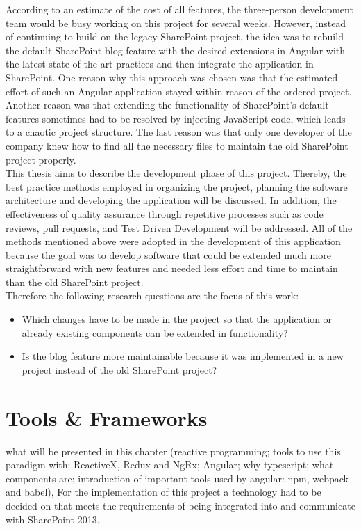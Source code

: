 \documentclass[Bachelor,BIF,english]{twbook}
\begin{document}
According to an estimate of the cost of all features, the three-person development team would be busy working on this project for several weeks. However, instead of continuing to build on the legacy SharePoint project, the idea was to rebuild the default SharePoint blog feature with the desired extensions in Angular with the latest state of the art practices and then integrate the application in SharePoint. One reason why this approach was chosen was that the estimated effort of such an Angular application stayed within reason of the ordered project. Another reason was that extending the functionality of SharePoint's default features sometimes had to be resolved by injecting JavaScript code, which leads to a chaotic project structure. The last reason was that only one developer of the company knew how to find all the necessary files to maintain the old SharePoint project properly.
\\[\baselineskip]
This thesis aims to describe the development phase of this project. Thereby, the best practice methods employed in organizing the project, planning the software architecture and developing the application will be discussed. In addition, the effectiveness of quality assurance through repetitive processes such as code reviews, pull requests, and Test Driven Development will be addressed. All of the methods mentioned above were adopted in the development of this application because the goal was to develop software that could be extended much more straightforward with new features and needed less effort and time to maintain than the old SharePoint project.
\\[\baselineskip]
Therefore the following research questions are the focus of this work:
\begin{itemize}
\item Which changes have to be made in the project so that the application or already existing components can be extended in functionality?
\item Is the blog feature more maintainable because it was implemented in a new project instead of the old SharePoint project?
\end{itemize}

\clearpage


\chapter{Tools \& Frameworks} 
what will be presented in this chapter (reactive programming; tools to use this paradigm with: ReactiveX, Redux and NgRx; Angular; why typescript; what components are; introduction of important tools used by angular: npm, webpack and babel),
For the implementation of this project a technology had to be decided on that meets the requirements of being integrated into and communicate with SharePoint 2013.
\end{document}
